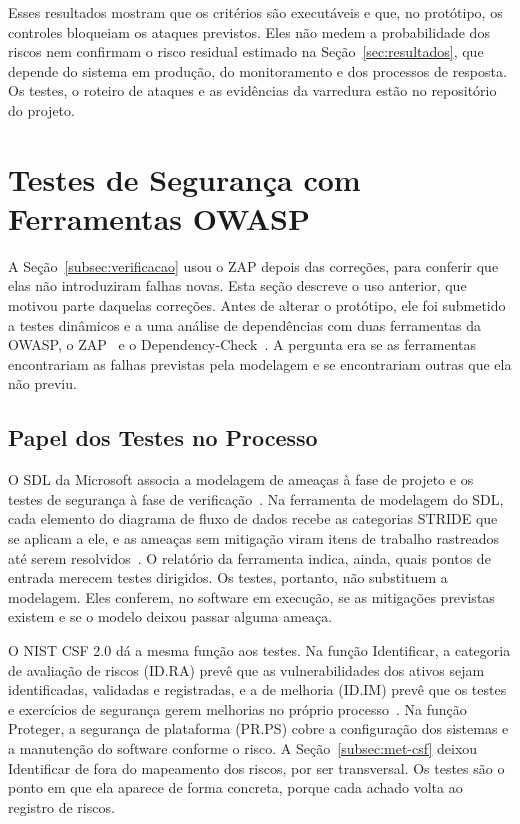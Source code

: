 \documentclass[conference]{IEEEtran}
\begin{document}
Esses resultados mostram que os critérios são executáveis e que, no protótipo, os controles bloqueiam os ataques previstos. Eles não medem a probabilidade dos riscos nem confirmam o risco residual estimado na Seção~\ref{sec:resultados}, que depende do sistema em produção, do monitoramento e dos processos de resposta. Os testes, o roteiro de ataques e as evidências da varredura estão no repositório do projeto.

\section{Testes de Segurança com Ferramentas OWASP}
\label{sec:testes-owasp}

A Seção~\ref{subsec:verificacao} usou o ZAP depois das correções, para conferir que elas não introduziram falhas novas. Esta seção descreve o uso anterior, que motivou parte daquelas correções. Antes de alterar o protótipo, ele foi submetido a testes dinâmicos e a uma análise de dependências com duas ferramentas da OWASP, o ZAP~\cite{zaproxy} e o Dependency-Check~\cite{owaspdepcheck}. A pergunta era se as ferramentas encontrariam as falhas previstas pela modelagem e se encontrariam outras que ela não previu.

\subsection{Papel dos Testes no Processo}
\label{subsec:owasp-papel}

O SDL da Microsoft associa a modelagem de ameaças à fase de projeto e os testes de segurança à fase de verificação~\cite{howard2006}. Na ferramenta de modelagem do SDL, cada elemento do diagrama de fluxo de dados recebe as categorias STRIDE que se aplicam a ele, e as ameaças sem mitigação viram itens de trabalho rastreados até serem resolvidos~\cite{shostack2009}. O relatório da ferramenta indica, ainda, quais pontos de entrada merecem testes dirigidos. Os testes, portanto, não substituem a modelagem. Eles conferem, no software em execução, se as mitigações previstas existem e se o modelo deixou passar alguma ameaça.

O NIST CSF 2.0 dá a mesma função aos testes. Na função Identificar, a categoria de avaliação de riscos (ID.RA) prevê que as vulnerabilidades dos ativos sejam identificadas, validadas e registradas, e a de melhoria (ID.IM) prevê que os testes e exercícios de segurança gerem melhorias no próprio processo~\cite{nist2024csf}. Na função Proteger, a segurança de plataforma (PR.PS) cobre a configuração dos sistemas e a manutenção do software conforme o risco. A Seção~\ref{subsec:met-csf} deixou Identificar de fora do mapeamento dos riscos, por ser transversal. Os testes são o ponto em que ela aparece de forma concreta, porque cada achado volta ao registro de riscos.
\end{document}
